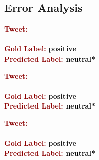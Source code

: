 \subsection{Error Analysis}

\begin{example}\label{snt:cgsa:exmp:socher11-error}
  \noindent\textup{\bfseries\textcolor{darkred}{Tweet:}} {\upshape }\\
  \noindent \\[\exampleSep]
  \noindent\textup{\bfseries\textcolor{darkred}{Gold Label:}}\hspace*{4.3em}\textbf{%
    \upshape\textcolor{green3}{positive}}\\
 \noindent\textup{\bfseries\textcolor{darkred}{Predicted Label:}}\hspace*{2em}\textbf{%
    \upshape\textcolor{black}{neutral*}}
\end{example}

\begin{example}\label{snt:cgsa:exmp:severyn-error}
  \noindent\textup{\bfseries\textcolor{darkred}{Tweet:}} {\upshape }\\
  \noindent \\[\exampleSep]
  \noindent\textup{\bfseries\textcolor{darkred}{Gold Label:}}\hspace*{4.3em}\textbf{%
    \upshape\textcolor{green3}{positive}}\\
 \noindent\textup{\bfseries\textcolor{darkred}{Predicted Label:}}\hspace*{2em}\textbf{%
    \upshape\textcolor{black}{neutral*}}
\end{example}

\begin{example}\label{snt:cgsa:exmp:baziotis-error}
  \noindent\textup{\bfseries\textcolor{darkred}{Tweet:}} {\upshape }\\
  \noindent \\[\exampleSep]
  \noindent\textup{\bfseries\textcolor{darkred}{Gold Label:}}\hspace*{4.3em}\textbf{%
    \upshape\textcolor{green3}{positive}}\\
 \noindent\textup{\bfseries\textcolor{darkred}{Predicted Label:}}\hspace*{2em}\textbf{%
    \upshape\textcolor{black}{neutral*}}
\end{example}

